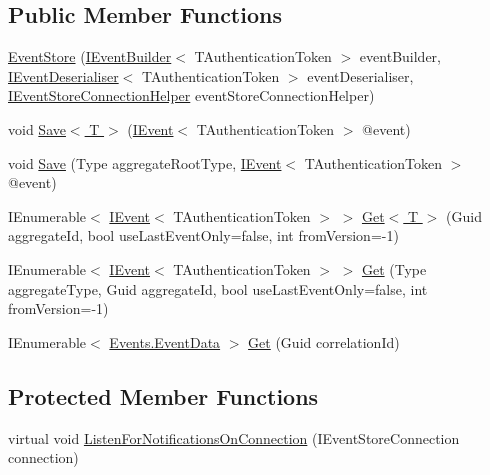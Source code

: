 \subsection*{Public Member Functions}
\begin{DoxyCompactItemize}
\item 
\hyperlink{classCqrs_1_1EventStore_1_1EventStore_ab48ad2c9d72780ae3a662e213498f194}{Event\+Store} (\hyperlink{interfaceCqrs_1_1EventStore_1_1IEventBuilder}{I\+Event\+Builder}$<$ T\+Authentication\+Token $>$ event\+Builder, \hyperlink{interfaceCqrs_1_1EventStore_1_1IEventDeserialiser}{I\+Event\+Deserialiser}$<$ T\+Authentication\+Token $>$ event\+Deserialiser, \hyperlink{interfaceCqrs_1_1EventStore_1_1IEventStoreConnectionHelper}{I\+Event\+Store\+Connection\+Helper} event\+Store\+Connection\+Helper)
\item 
void \hyperlink{classCqrs_1_1EventStore_1_1EventStore_a7261e5b74f55ef7afd23144c155ba116}{Save$<$ T $>$} (\hyperlink{interfaceCqrs_1_1Events_1_1IEvent}{I\+Event}$<$ T\+Authentication\+Token $>$ @event)
\item 
void \hyperlink{classCqrs_1_1EventStore_1_1EventStore_adce33037e2a3eb81cfccded42ba2ed35}{Save} (Type aggregate\+Root\+Type, \hyperlink{interfaceCqrs_1_1Events_1_1IEvent}{I\+Event}$<$ T\+Authentication\+Token $>$ @event)
\item 
I\+Enumerable$<$ \hyperlink{interfaceCqrs_1_1Events_1_1IEvent}{I\+Event}$<$ T\+Authentication\+Token $>$ $>$ \hyperlink{classCqrs_1_1EventStore_1_1EventStore_aaa4ebd61c84124425380ce31e3a67600}{Get$<$ T $>$} (Guid aggregate\+Id, bool use\+Last\+Event\+Only=false, int from\+Version=-\/1)
\item 
I\+Enumerable$<$ \hyperlink{interfaceCqrs_1_1Events_1_1IEvent}{I\+Event}$<$ T\+Authentication\+Token $>$ $>$ \hyperlink{classCqrs_1_1EventStore_1_1EventStore_a9d7b3a3ebcf110fe02d53e2ada19933d}{Get} (Type aggregate\+Type, Guid aggregate\+Id, bool use\+Last\+Event\+Only=false, int from\+Version=-\/1)
\item 
I\+Enumerable$<$ \hyperlink{classCqrs_1_1Events_1_1EventData}{Events.\+Event\+Data} $>$ \hyperlink{classCqrs_1_1EventStore_1_1EventStore_a898b51899af27db8aa0fb0c0dc75b25d}{Get} (Guid correlation\+Id)
\end{DoxyCompactItemize}
\subsection*{Protected Member Functions}
\begin{DoxyCompactItemize}
\item 
virtual void \hyperlink{classCqrs_1_1EventStore_1_1EventStore_add7396a800fe8f64c61406311e8fee1d}{Listen\+For\+Notifications\+On\+Connection} (I\+Event\+Store\+Connection connection)
\end{DoxyCompactItemize}

